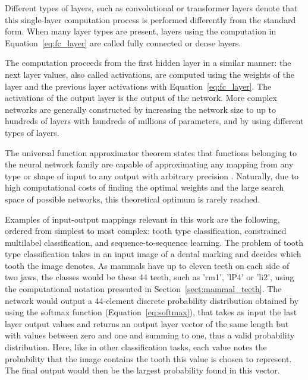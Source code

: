 \documentclass{article}
\begin{document}
Different types of layers, such as convolutional or transformer layers 
denote that this single-layer computation process is performed differently from 
the standard form. When many layer types are present, layers using the computation
in Equation~\ref{eq:fc_layer} are called fully connected or dense layers.

The computation proceeds from the first hidden layer in a similar manner: 
the next layer values, also called activations, are computed using the weights of 
the layer and the previous layer activations with Equation~\ref{eq:fc_layer}.
The activations of the output layer is the output of the network.
More complex networks are generally constructed by increasing the network size to up to 
hundreds of layers with hundreds of millions of parameters, and by using
different types of layers.

The universal function approximator theorem states that functions belonging to the 
neural network family are capable of approximating any mapping from any type or shape of input
to any output with arbitrary precision \cite{princebook}. Naturally, due to high computational 
costs of finding the optimal weights and the large search space of possible networks, 
this theoretical optimum is rarely reached.

Examples of input-output mappings relevant in this work are the following, 
ordered from simplest to most complex: tooth type classification, constrained multilabel classification, 
and sequence-to-sequence learning. The problem of tooth type classification takes in an input image of a dental marking
 and decides which tooth the image denotes.
As mammals have up to eleven teeth on each side of two jaws, the classes would be 
these 44 teeth, such as 'rm1', 'lP4' or 'li2', using the computational notation presented in
Section~\ref{sect:mammal_teeth}. The network would output a 44-element discrete probability distribution 
obtained by using the softmax function (Equation~\ref{eq:softmax}), that takes as input the last layer output
values and returns an output layer vector of the same length but with values between zero and one and summing to one, 
thus a valid probability distribution.
Here, like in other classification tasks, each value notes the probability that the image contains 
the tooth this value is chosen to represent. The final output would then be the largest probability
found in this vector.
\end{document}
